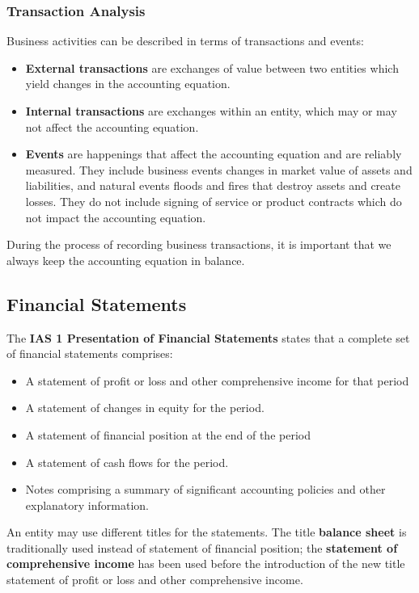 \documentclass[../main.tex]{subfiles}
\begin{document}
	\subsubsection{Transaction Analysis}
	
	Business activities can be described in terms of transactions and events:
	\begin{itemize}[noitemsep]
		\item \textbf{External transactions} are exchanges of value between two 
		entities which yield changes in the accounting equation.
		\item \textbf{Internal transactions} are exchanges within an entity, 
		which may or may not affect the accounting equation.
		\item \textbf{Events} are happenings that affect the accounting 
		equation and are reliably measured. They include business events \eg 
		changes in market value of assets and liabilities, and natural events 
		\eg floods and fires that destroy assets and create losses. They do not 
		include \eg signing of service or product contracts which do not 
		impact the accounting equation.
	\end{itemize}
	
	During the process of recording business transactions, it is important that 
	we always keep the accounting equation in balance. 
	
	\subsection{Financial Statements}
	
	The \textbf{IAS 1 Presentation of Financial Statements} states that a 
	complete set of financial statements comprises:
	\begin{itemize}[noitemsep]
		\item A statement of profit or loss and other comprehensive 
		income for that period
		\item A statement of changes in equity for the period. 
		\item A statement of financial position at the end of the period
		\item A statement of cash flows for the period.
		\item Notes comprising a summary of significant accounting 
		policies and other explanatory information. 
	\end{itemize}
	
	An entity may use different titles for the statements. The title 
	\textbf{balance sheet} is traditionally used instead of statement of 
	financial position; the \textbf{statement of comprehensive income} has been 
	used before the introduction of the new title statement of profit or loss 
	and other comprehensive income.
	
\end{document}

